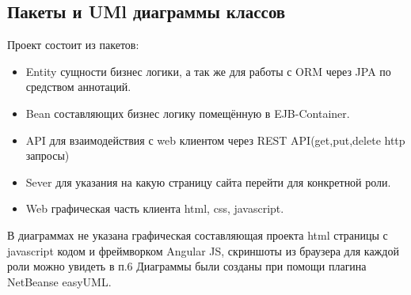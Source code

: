 \subsection{Пакеты и UMl диаграммы классов}
Проект состоит из пакетов:
\begin{itemize}
\item Entity сущности бизнес логики, а так же для работы с ORM через JPA по средством аннотаций.
\item Bean составляющих бизнес логику помещённую в EJB-Container.
\item API для взаимодействия с web клиентом через REST API(get,put,delete http запросы)
\item Sever для указания на какую страницу сайта перейти для конкретной роли.
\item Web графическая часть клиента html, css, javascript.
\end{itemize}
В диаграммах не указана графическая составляющая проекта html страницы с javascript кодом и фреймворком Angular JS, скриншоты из браузера для каждой роли можно увидеть в п.6
Диаграммы были созданы при помощи плагина NetBeanse easyUML.
\newpage
